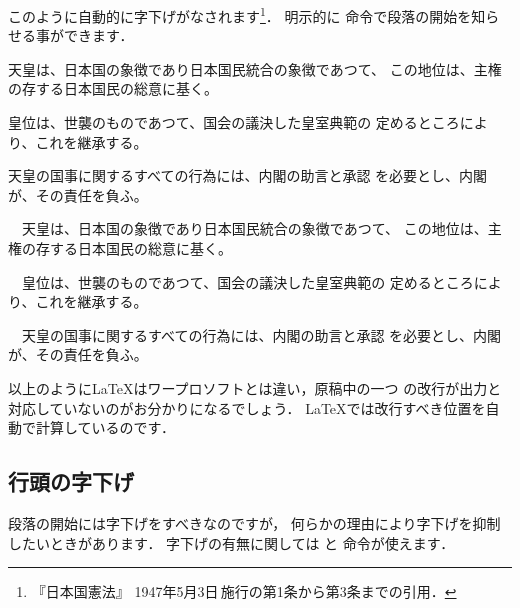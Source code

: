 このように自動的に字下げがなされます\footnote
   {『日本国憲法』 1947年5月3日\,施行の第1条から第3条までの引用．}．
明示的に 命令で段落の開始を知らせる事ができます．

\begin{usage}
\par %
\end{usage}

\begin{inonly}
天皇は、日本国の象徴であり日本国民統合の象徴であつて、
この地位は、主権の存する日本国民の総意に基く。\par
皇位は、世襲のものであつて、国会の議決した皇室典範の
定めるところにより、これを継承する。\par
天皇の国事に関するすべての行為には、内閣の助言と承認
を必要とし、内閣が、その責任を負ふ。\par
\end{inonly}
\begin{outonly}
　天皇は、日本国の象徴であり日本国民統合の象徴であつて、
この地位は、主権の存する日本国民の総意に基く。\par
　皇位は、世襲のものであつて、国会の議決した皇室典範の
定めるところにより、これを継承する。\par
　天皇の国事に関するすべての行為には、内閣の助言と承認
を必要とし、内閣が、その責任を負ふ。\par
\end{outonly}

%
%
%
%
以上のように{\LaTeX}はワープロソフトとは違い，{原稿中の一つ
の改行が出力と対応していない}のがお分かりになるでしょう．
{\LaTeX}では{改行}すべき位置を自動で計算しているのです．



\subsection{行頭の字下げ}
%
%
%

段落の開始には字下げをすべきなのですが，
何らかの理由により字下げを抑制したいときがあります．
字下げの有無に関しては  と  
命令が使えます．
\begin{usage}
\indent   %
\noindent %
\end{usage}

